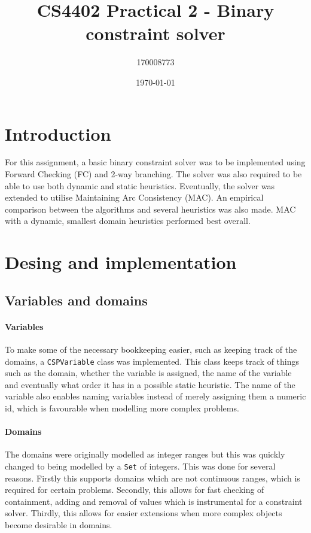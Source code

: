 \documentclass[british]{article}
\title{CS4402 Practical 2 - Binary constraint solver}
\author{170008773}
\date{\today}
\newcommand{\code}[1]{\texttt{#1}}
\begin{document}
	\maketitle
	
	\section{Introduction}
	For this assignment, a basic binary constraint solver was to be implemented using Forward Checking (FC) and 2-way branching. The solver was also required to be able to use both dynamic and static heuristics.  Eventually, the solver was extended to utilise Maintaining Arc Consistency (MAC). An empirical comparison between the algorithms and several heuristics was also made. MAC with a dynamic, smallest domain heuristics performed best overall. 
	
	
	\section{Desing and implementation}
	\subsection{Variables and domains}
	\paragraph{Variables}To make some of the necessary bookkeeping easier, such as keeping track of the domains, a \code{CSPVariable} class was implemented. This class keeps track of things such as the domain, whether the variable is assigned, the name of the variable and eventually what order it has in a possible static heuristic. The name of the variable also enables naming variables instead of merely assigning them a numeric id, which is favourable when modelling more complex problems. 
	
	\paragraph{Domains} The domains were originally modelled as integer ranges but this was quickly changed to being modelled by a \code{Set} of integers. This was done for several reasons. Firstly this supports domains which are not continuous ranges, which is required for certain problems. Secondly, this allows for fast checking of containment, adding and removal of values which is instrumental for a constraint solver. Thirdly, this allows for easier extensions when more complex objects become desirable in domains. 
	
\end{document}
